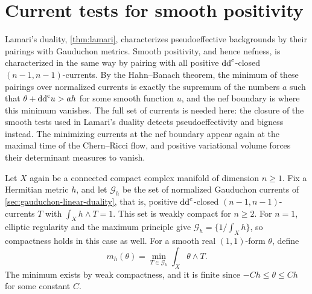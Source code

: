 \section{Current tests for smooth positivity}
\label{sec:smooth-cone-current-duality}

Lamari's duality, \cref{thm:lamari}, characterizes pseudoeffective backgrounds by their pairings with Gauduchon metrics. Smooth positivity, and hence nefness, is characterized in the same way by pairing with all positive $\mathrm{dd}^{\mathrm{c}}$-closed $(n-1,n-1)$-currents. By the Hahn--Banach theorem, the minimum of these pairings over normalized currents is exactly the supremum of the numbers $a$ such that $\theta+\mathrm{dd}^{\mathrm{c}} u>ah$ for some smooth function $u$, and the nef boundary is where this minimum vanishes. The full set of currents is needed here: the closure of the smooth tests used in Lamari's duality detects pseudoeffectivity and bigness instead. The minimizing currents at the nef boundary appear again at the maximal time of the Chern--Ricci flow, and positive variational volume forces their determinant measures to vanish.

Let $X$ again be a connected compact complex manifold of dimension $n\geq1$. Fix a Hermitian metric $h$, and let $\mathscr G_h$ be the set of normalized Gauduchon currents of \cref{sec:gauduchon-linear-duality}, that is, positive $\mathrm{dd}^{\mathrm{c}}$-closed $(n-1,n-1)$-currents $T$ with $\int_Xh\wedge T=1$. This set is weakly compact for $n\geq2$. For $n=1$, elliptic regularity and the maximum principle give $\mathscr G_h=\{1/\int_Xh\}$, so compactness holds in this case as well.
For a smooth real $(1,1)$-form $\theta$, define
\[
 m_h(\theta)=\min_{T\in\mathscr G_h}\int_X\theta\wedge T.
\]
The minimum exists by weak compactness, and it is finite since $-Ch\leq\theta\leq Ch$ for some constant $C$.

